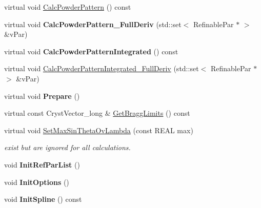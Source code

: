 \begin{DoxyCompactItemize}
\item 
virtual void \mbox{\hyperlink{class_obj_cryst_1_1_powder_pattern_background_a6e564159536442870bfb17be8e5b51e8}{Calc\+Powder\+Pattern}} () const
\item 
\mbox{\label{class_obj_cryst_1_1_powder_pattern_background_a000973298590f39e8bd62d29e7d724c9}} 
virtual void {\bfseries Calc\+Powder\+Pattern\+\_\+\+Full\+Deriv} (std\+::set$<$ Refinable\+Par $\ast$ $>$ \&v\+Par)
\item 
\mbox{\label{class_obj_cryst_1_1_powder_pattern_background_a4f103bc44b507ce87d82816626871fb0}} 
virtual void {\bfseries Calc\+Powder\+Pattern\+Integrated} () const
\item 
virtual void \mbox{\hyperlink{class_obj_cryst_1_1_powder_pattern_background_a044838d76b1878a029d587480636e80e}{Calc\+Powder\+Pattern\+Integrated\+\_\+\+Full\+Deriv}} (std\+::set$<$ Refinable\+Par $\ast$ $>$ \&v\+Par)
\item 
\mbox{\label{class_obj_cryst_1_1_powder_pattern_background_acede73f7ce7199fb37a2946334567bd9}} 
virtual void {\bfseries Prepare} ()
\item 
virtual const Cryst\+Vector\+\_\+long \& \mbox{\hyperlink{class_obj_cryst_1_1_powder_pattern_background_ae75d135c8faa3aa4e0d7e145d848e8a1}{Get\+Bragg\+Limits}} () const
\item 
virtual void \mbox{\hyperlink{class_obj_cryst_1_1_powder_pattern_background_a3d1c345df8269ff883bd3b6f82b57d57}{Set\+Max\+Sin\+Theta\+Ov\+Lambda}} (const R\+E\+AL max)
\begin{DoxyCompactList}\small\item\em exist but are ignored for all calculations. \end{DoxyCompactList}\item 
\mbox{\label{class_obj_cryst_1_1_powder_pattern_background_a5ec5ac4fd9ac7247fdb29c1b40e4369b}} 
void {\bfseries Init\+Ref\+Par\+List} ()
\item 
\mbox{\label{class_obj_cryst_1_1_powder_pattern_background_a9546d8c2c1de47d8eea570f20ab45bcb}} 
void {\bfseries Init\+Options} ()
\item 
\mbox{\label{class_obj_cryst_1_1_powder_pattern_background_aa1aa5762ecafec82b1c3dba85506240d}} 
void {\bfseries Init\+Spline} () const
\end{DoxyCompactItemize}

